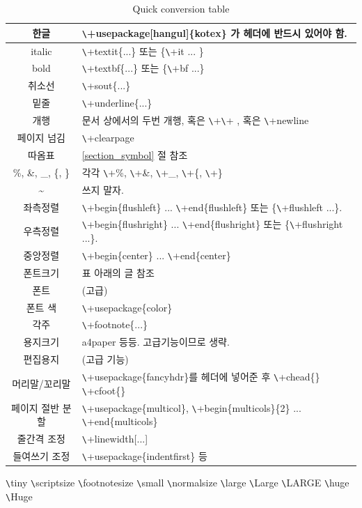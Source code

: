 \documentclass[11pt]{article}
\begin{document}
\begin{table}[h]
	\centering
	\begin{tabular}{|c|l|}
		\hline
		한글 & \verb+\+usepackage[hangul]\{kotex\} 가 헤더에 반드시 있어야 함.\\
		\hline
		italic & \verb+\+textit\{...\} 또는 \{\verb+\+it ... \} \\
		\hline
		bold & \verb+\+textbf\{...\} 또는 \{\verb+\+bf ...\} \\
		\hline
		취소선 & \verb+\+sout\{...\} \\
		\hline
		밑줄 & \verb+\+underline\{...\} \\
		\hline
		개행 & 문서 상에서의 두번 개행, 혹은 \verb+\+\verb+\+ , 혹은 \verb+\+newline \\
		\hline
		페이지 넘김 & \verb+\+clearpage \\
		\hline
		따옴표 & \ref{section_symbol} 절 참조 \\
		\hline
		\%, \&, \_, \{, \} & 각각 \verb+\+\%, \verb+\+\&, \verb+\+\_, \verb+\+\{, \verb+\+\} \\
		\hline
		\~{} & 쓰지 말자. \\
		\hline
		좌측정렬 & \verb+\+begin\{flushleft\} ... \verb+\+end\{flushleft\} 또는 \{\verb+\+flushleft ...\}.\\
		\hline
		우측정렬 & \verb+\+begin\{flushright\} ... \verb+\+end\{flushright\} 또는 \{\verb+\+flushright ...\}.\\
		\hline
		중앙정렬 & \verb+\+begin\{center\} ... \verb+\+end\{center\} \\
		\hline
		폰트크기 & 표 아래의 글 참조 \\
		\hline
		폰트 & (고급) \\
		\hline
		폰트 색 & \verb+\+usepackage\{color\} \\
		\hline
		각주 & \verb+\+footnote\{...\} \\
		\hline
		용지크기 & a4paper 등등. 고급기능이므로 생략. \\
		\hline
		편집용지 & (고급 기능) \\
		\hline
		머리말/꼬리말 & \verb+\+usepackage\{fancyhdr\}를 헤더에 넣어준 후 \verb+\+chead\{\} \verb+\+cfoot\{\} \\
		\hline
		페이지 절반 분할 & \verb+\+usepackage\{multicol\},  \verb+\+begin\{multicols\}\{2\} ... \verb+\+end\{multicols\} \\
		\hline
		줄간격 조정 & \verb+\+linewidth[...] \\
		\hline
		들여쓰기 조정 & \verb+\+usepackage\{indentfirst\} 등 \\
		\hline
	\end{tabular}
	\caption{Quick conversion table}
	\label{Quick_table}
\end{table}
{\tiny \verb+\+tiny} {\scriptsize \verb+\+scriptsize} {\footnotesize \verb+\+footnotesize} {\small \verb+\+small} {\normalsize \verb+\+normalsize} {\large \verb+\+large} {\Large \verb+\+Large} {\LARGE \verb+\+LARGE} {\huge \verb+\+huge} {\Huge \verb+\+Huge}
\end{document}
